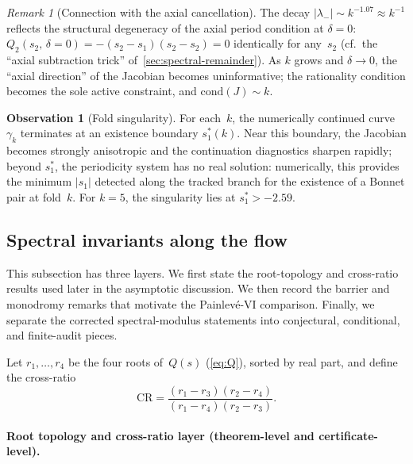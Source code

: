 \documentclass[11pt,a4paper]{article}
\theoremstyle{plain}
\theoremstyle{definition}
\newtheorem{observation}[theorem]{Observation}
\theoremstyle{remark}
\newtheorem{remark}[theorem]{Remark}
\newcommand{\abs}[1]{\lvert #1 \rvert}
\begin{document}
\begin{remark}[Connection with the axial cancellation]
\label{rem:axial-eigenvalue}
The decay $\abs{\lambda_-} \sim k^{-1.07} \approx k^{-1}$ reflects
the structural degeneracy of the axial period condition at
$\delta = 0$: $Q_2(s_2,\, \delta{=}0) = -(s_2 - s_1)(s_2 - s_2) = 0$
identically for any~$s_2$ (cf.\ the ``axial subtraction trick''
of~\cref{sec:spectral-remainder}).  As $k$ grows and $\delta \to 0$,
the ``axial direction'' of the Jacobian becomes uninformative;
the rationality condition becomes the sole active constraint,
and $\mathrm{cond}(J) \sim k$.
\end{remark}

\begin{observation}[Fold singularity]
\label{obs:fold}
For each~$k$, the numerically continued curve $\gamma_k$ terminates at an
existence boundary $s_1^*(k)$.  Near this boundary, the Jacobian becomes
strongly anisotropic and the continuation diagnostics sharpen rapidly;
beyond $s_1^*$, the periodicity system has no real solution:
numerically, this provides the minimum $\abs{s_1}$ detected along the
tracked branch for the existence of a Bonnet pair at fold~$k$.
For $k = 5$, the singularity lies at $s_1^* > -2.59$.
\end{observation}

\subsection{Spectral invariants along the flow}%
\label{sec:spectral-inv}

This subsection has three layers.  We first state the root-topology and
cross-ratio results used later in the asymptotic discussion.  We then record
the barrier and monodromy remarks that motivate the Painlev\'e-VI comparison.
Finally, we separate the corrected spectral-modulus statements into
conjectural, conditional, and finite-audit pieces.

Let $r_1, \ldots, r_4$ be the four roots of~$Q(s)$
(\cref{eq:Q}), sorted by real part, and define the
cross-ratio
\begin{equation}
  \mathrm{CR}
  = \frac{(r_1 - r_3)(r_2 - r_4)}{(r_1 - r_4)(r_2 - r_3)}.
  \label{eq:CR}
\end{equation}

\paragraph{Root topology and cross-ratio layer (theorem-level and certificate-level).}
\end{document}
